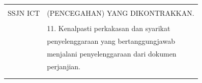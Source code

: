 \documentclass[
]{article}
\begin{document}
\begin{longtable}[]{@{}ll@{}}
\begin{minipage}[t]{0.71\columnwidth}
\end{minipage}\tabularnewline
\begin{minipage}[t]{0.23\columnwidth}\raggedright
SSJN ICT\strut
\end{minipage} & \begin{minipage}[t]{0.71\columnwidth}\raggedright
(PENCEGAHAN) YANG DIKONTRAKKAN.\strut
\end{minipage}\tabularnewline
\begin{minipage}[t]{0.23\columnwidth}\raggedright
\strut
\end{minipage} & \begin{minipage}[t]{0.71\columnwidth}\raggedright
\strut
\end{minipage}\tabularnewline
\begin{minipage}[t]{0.23\columnwidth}\raggedright
\strut
\end{minipage} & \begin{minipage}[t]{0.71\columnwidth}\raggedright
11. Kenalpasti perkakasan dan syarikat\strut
\end{minipage}\tabularnewline
\begin{minipage}[t]{0.23\columnwidth}\raggedright
\strut
\end{minipage} & \begin{minipage}[t]{0.71\columnwidth}\raggedright
penyelenggaraan yang bertanggungjawab\strut
\end{minipage}\tabularnewline
\begin{minipage}[t]{0.23\columnwidth}\raggedright
\strut
\end{minipage} & \begin{minipage}[t]{0.71\columnwidth}\raggedright
menjalani penyelenggaraan dari dokumen\strut
\end{minipage}\tabularnewline
\begin{minipage}[t]{0.23\columnwidth}\raggedright
\strut
\end{minipage} & \begin{minipage}[t]{0.71\columnwidth}\raggedright
perjanjian.\strut
\end{minipage}\tabularnewline
\begin{minipage}[t]{0.23\columnwidth}\raggedright
\strut
\end{minipage} & \begin{minipage}[t]{0.71\columnwidth}\raggedright
\strut
\end{minipage}\tabularnewline
\begin{minipage}[t]{0.23\columnwidth}\raggedright
\strut
\end{minipage} & \begin{minipage}[t]{0.71\columnwidth}\raggedright

\end{minipage}
\end{longtable}
\end{document}
